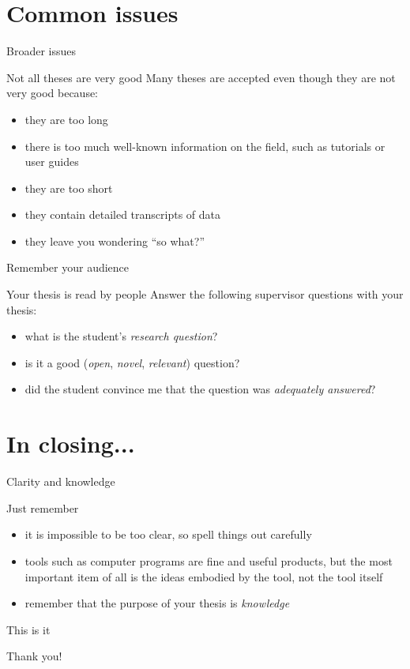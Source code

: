 \documentclass{beamer}
\begin{document}
\section{Common issues}
\begin{frame}{Broader issues}
\begin{block}{Not all theses are very good}
Many theses are accepted even though they are not very good because:
\begin{itemize}
\item they are too long
\item there is too much well-known information on the field, such as tutorials or user guides
\item they are too short
\item they contain detailed transcripts of data
\item they leave you wondering ``so what?''
\end{itemize}
\end{block}
\end{frame}


\begin{frame}{Remember your audience}
\begin{block}{Your thesis is read by people}
Answer the following supervisor questions with your thesis:
\begin{itemize}
\item what is the student's \textit{research question}?
\item is it a good (\textit{open}, \textit{novel}, \textit{relevant}) question?
\item did the student convince me that the question was \textit{adequately answered}?
\end{itemize}
\end{block}
\end{frame}


\section{In closing...}
\begin{frame}{Clarity and knowledge}
\begin{block}{Just remember}
\begin{itemize}
\item it is impossible to be too clear, so spell things out carefully
\item tools such as computer programs are fine and useful products, but the most important item of all is the ideas embodied by the tool, not the tool itself
\item remember that the purpose of your thesis is \textit{knowledge}
\end{itemize}
\end{block}
\end{frame}


\begin{frame}{This is it}
\begin{block}{ }
Thank you!
\end{block}
\end{frame}


%
%
\end{document}
